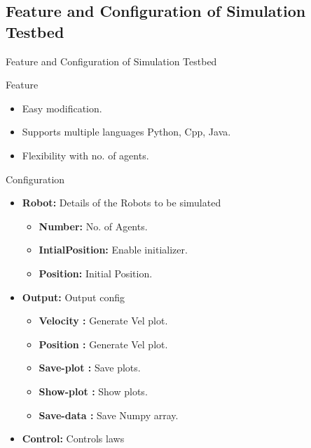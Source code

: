 \documentclass[10pt]{beamer}
\begin{document}
\subsection*{Feature and Configuration of Simulation Testbed}
\begin{frame}{Feature and Configuration of Simulation Testbed}
	\vspace*{-0.2 cm}
	\begin{block}{Feature}
		\begin{itemize}
			\item Easy modification.
			\item Supports multiple languages Python, Cpp, Java.
			\item Flexibility with no. of agents.
		\end{itemize}
	\end{block}
	\pause
	\vspace*{-0.2 cm}
	\begin{block}{Configuration}
	\begin{minipage}{0.47\textwidth}
		\begin{itemize}
			\item \textbf{Robot:} Details of the Robots to be simulated
			      \begin{itemize}
				      \item \textbf{Number:} No. of Agents.
				      \item \textbf{IntialPosition:} Enable initializer.
				      \item \textbf{Position:} Initial Position.
			      \end{itemize}
			\item \textbf{Output:} Output config
			      \begin{itemize}
				      \item \textbf{Velocity : }Generate Vel plot.
				      \item \textbf{Position : }Generate Vel plot.
				      \item \textbf{Save-plot : }Save plots.
				      \item \textbf{Show-plot : }Show plots.
				      \item \textbf{Save-data : }Save Numpy array.
			      \end{itemize}
		\end{itemize}
	\end{minipage}
	\begin{minipage}{0.47\textwidth}
		\begin{itemize}
			\item \textbf{Control: }Controls laws

\end{itemize}
\end{minipage}
\end{block}
\end{frame}
\end{document}
